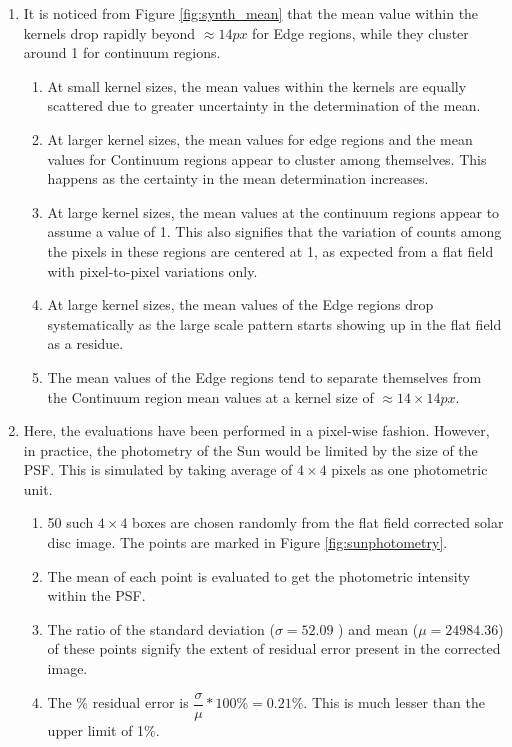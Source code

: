 \documentclass[11pt,a4paper]{article}
\begin{document}
\begin{enumerate}
		\item \label{point:Mean}It is noticed from Figure \ref{fig:synth_mean} that the mean value within the kernels drop rapidly beyond $\approx 14 px$ for Edge regions, while they cluster around 1 for continuum regions.
		\begin{enumerate}
			\item At small kernel sizes, the mean values within the kernels are equally scattered due to greater uncertainty in the determination of the mean.
			\item At larger kernel sizes, the mean values for edge regions and the mean values for Continuum regions appear to cluster among themselves. This happens as the certainty in the mean determination increases.
			\item At large kernel sizes, the mean values at the continuum regions appear to assume a value of 1. This also signifies that the variation of counts among the pixels in these regions are centered at 1, as expected from a flat field with pixel-to-pixel variations only.
			\item At large kernel sizes, the mean values of the Edge regions drop systematically as the large scale pattern starts showing up in the flat field as a residue.
			\item The mean values of the Edge regions tend to separate themselves from the Continuum region mean values at a kernel size of $\approx 14\times14 px$.
		\end{enumerate}
	
	\item Here, the evaluations have been performed in a pixel-wise fashion. However, in practice, the photometry of the Sun would be limited by the size of the PSF. This is simulated by taking average of $4 \times 4$ pixels as one photometric unit.
	\begin{enumerate}
		\item 50 such $4\times4$ boxes are chosen randomly from the flat field corrected solar disc image. The points are marked in Figure \ref{fig:sunphotometry}.
		\item The mean of each point is evaluated to get the photometric intensity within the PSF.
		\item The ratio of the standard deviation ($\sigma= 52.09$ ) and mean ($\mu= 24984.36$) of these points signify the extent of residual error present in the corrected image.
		\item The \% residual error is $\dfrac{\sigma}{\mu}*100\%= 0.21\%$. This is much lesser than the upper limit of 1\%.
	\end{enumerate}
	\end{enumerate}
	
\end{document}
